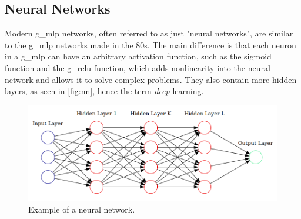 \subsection{Neural Networks}
Modern \gls*{g_mlp} networks, often referred to as just "neural networks", are similar to the \gls*{g_mlp} networks made in the 80s. The main difference is that each neuron in a \gls*{g_mlp} can have an arbitrary activation function, such as the sigmoid function and the \gls*{g_relu}\cite{relu} function, which adds nonlinearity into the neural network and allows it to solve complex problems. They also contain more hidden layers, as seen in \autoref{fig:nn}, hence the term \textit{deep} learning.
\begin{figure}[H]
    \centering
    \includegraphics[width=\linewidth]{resources/related_works/nn.gv.png}
    \caption{Example of a neural network.}
    \label{fig:nn}
\end{figure}

